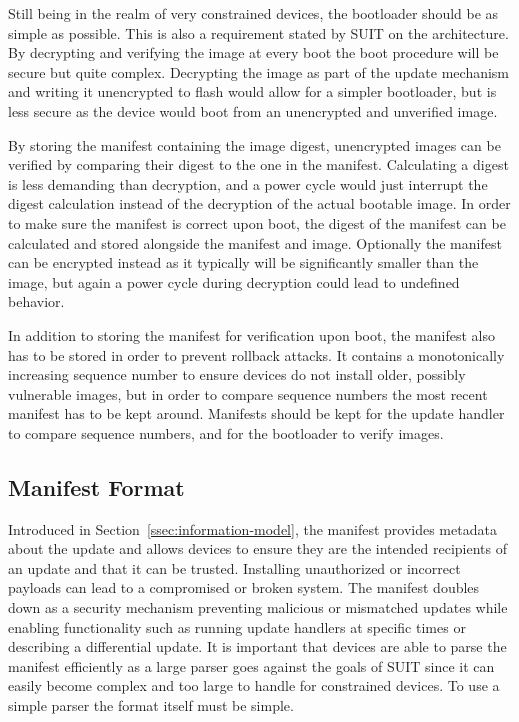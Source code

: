 \documentclass[0-thesis.tex]{subfiles}
\begin{document}
Still being in the realm of very constrained devices, the bootloader should be as simple
as possible. This is also a requirement stated by SUIT on the architecture. By decrypting
and verifying the image at every boot the boot procedure will be secure but quite complex.
Decrypting the image as part of the update mechanism and writing it unencrypted to flash
would allow for a simpler bootloader, but is less secure as the device would boot from an
unencrypted and unverified image.

By storing the manifest containing the image digest, unencrypted images can be verified by
comparing their digest to the one in the manifest. Calculating a digest is less demanding
than decryption, and a power cycle would just interrupt the digest calculation instead of
the decryption of the actual bootable image. In order to make sure the manifest is correct
upon boot, the digest of the manifest can be calculated and stored alongside the manifest
and image. Optionally the manifest can be encrypted instead as it typically will be
significantly smaller than the image, but again a power cycle during decryption could lead
to undefined behavior.

In addition to storing the manifest for verification upon boot, the manifest also has to
be stored in order to prevent rollback attacks. It contains a monotonically increasing
sequence number to ensure devices do not install older, possibly vulnerable images, but in
order to compare sequence numbers the most recent manifest has to be kept around.
Manifests should be kept for the update handler to compare sequence numbers, and for the
bootloader to verify images.

\subsection{Manifest Format}
\label{ssec:manifest-format}
Introduced in Section~\ref{ssec:information-model}, the manifest provides metadata about
the update and allows devices to ensure they are the intended recipients of an update and
that it can be trusted. Installing unauthorized or incorrect payloads can lead to a
compromised or broken system. The manifest doubles down as a security mechanism preventing
malicious or mismatched updates while enabling functionality such as running update
handlers at specific times or describing a differential update. It is important that
devices are able to parse the manifest efficiently as a large parser goes against the
goals of SUIT since it can easily become complex and too large to handle for constrained
devices. To use a simple parser the format itself must be simple.
\end{document}

